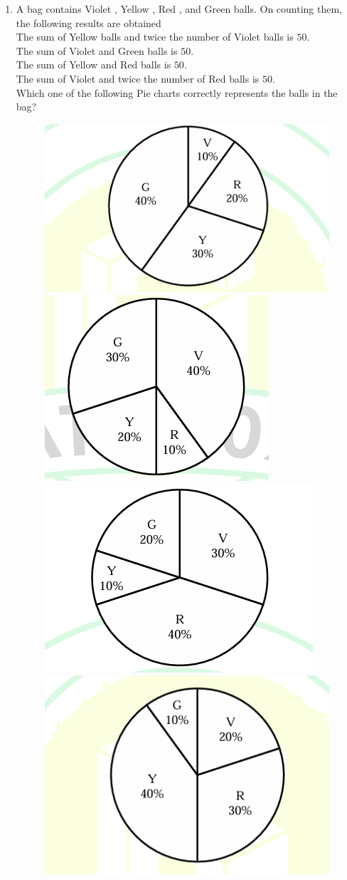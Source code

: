 \documentclass[journal]{IEEEtran}
\begin{document}
\begin{enumerate}
    \item A bag contains Violet , Yellow , Red , and Green  balls. On counting them, the following results are obtained\brak{\text{:}}\\
     The sum of Yellow balls and twice the number of Violet balls is $50$.\\
     The sum of Violet and Green balls is $50$.\\
     The sum of Yellow and Red balls is $50$.\\
     The sum of Violet and twice the number of Red balls is $50$.\\
    Which one of the following Pie charts correctly represents the balls in the bag?

    \hfill{}

    \begin{figure}[H]
        \centering
        \includegraphics[width=0.45\columnwidth]{figs/a38a.png}
        \includegraphics[width=0.45\columnwidth]{figs/a38b.png}\\
        \includegraphics[width=0.45\columnwidth]{figs/a38c.png}
        \includegraphics[width=0.45\columnwidth]{figs/a38d.png}
        \caption*{}
        \label{fig:q5_options}
    \end{figure}


\end{enumerate}
\end{document}
